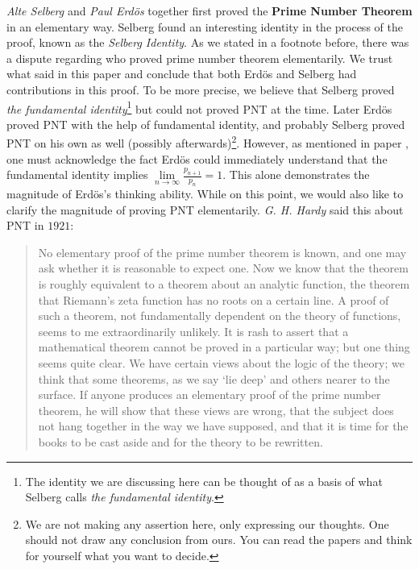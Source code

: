 \documentclass{subfile}
\begin{document}
	\textit{Alte Selberg} and \textit{Paul Erd\" os} together first proved the \textbf{Prime Number Theorem} in an elementary way. Selberg found an interesting identity in the process of the proof, known as the \textit{Selberg Identity}. As we stated in a footnote before, there was a dispute regarding who proved prime number theorem elementarily. We trust what \textcite{goldfeld_2004} said in this paper and conclude that both Erd\" os and Selberg had contributions in this proof. To be more precise, we believe that Selberg proved \textit{the fundamental identity}\footnote{The identity we are discussing here can be thought of as a basis of what Selberg calls \textit{the fundamental identity}.} but could not proved PNT at the time. Later Erd\" os proved PNT with the help of fundamental identity, and probably Selberg proved PNT on his own as well (possibly afterwards)\footnote{We are not making any assertion here, only expressing our thoughts. One should not draw any conclusion from ours. You can read the papers and think for yourself what you want to decide.}. However, as mentioned in paper \textcite[Page $6$]{goldfeld_2004}, one must acknowledge the fact Erd\" os could immediately understand that the fundamental identity implies $\lim\limits_{n\to\infty}\frac{p_{n+1}}{p_n}=1$. This alone demonstrates the magnitude of Erd\" os's thinking ability. While on this point, we would also like to clarify the magnitude of proving PNT elementarily. \textit{G. H. Hardy} \textcite[Page $3$]{goldfeld_2004} said this about PNT in $1921$:
		\begin{quote}
			No elementary proof of the prime number theorem is known, and one may
			ask whether it is reasonable to expect one. Now we know that the theorem
			is roughly equivalent to a theorem about an analytic function, the theorem
			that Riemann's zeta function has no roots on a certain line. A proof of such
			a theorem, not fundamentally dependent on the theory of functions, seems to
			me extraordinarily unlikely. It is rash to assert that a mathematical theorem
			cannot be proved in a particular way; but one thing seems quite clear. We have
			certain views about the logic of the theory; we think that some theorems, as we
			say `lie deep' and others nearer to the surface. If anyone produces an elementary
			proof of the prime number theorem, he will show that these views are wrong,
			that the subject does not hang together in the way we have supposed, and that
			it is time for the books to be cast aside and for the theory to be rewritten.
		\end{quote}
	
\end{document}
